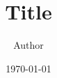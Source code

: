 \documentclass[12pt]{article}
\title{Title}
\author{Author}
\date{\today}
\begin{document}
\maketitle

\lipsum
\end{document}
